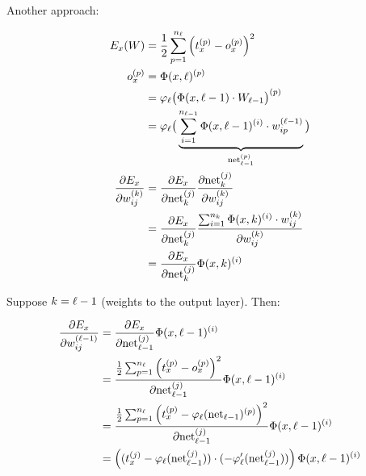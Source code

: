 


Another approach:

\begin{align}
    E_x(W) &= \frac{1}{2} \sum_{p=1}^{n_{\ell}} \left ( t_x^{(p)} -o_x^{(p)} \right )^2\\
    o_x^{(p)} &= \Phi(x, {\ell})^{(p)} \\
              &= \varphi_{{\ell}} \big (\Phi(x, {\ell}-1) \cdot W_{{\ell}-1} \big)^{(p)}\\
              &= \varphi_{{\ell}} \big (
                  \underbrace{
                      \sum_{i=1}^{n_{{\ell}-1}} \Phi(x, {\ell}-1)^{(i)} \cdot w_{ip}^{({\ell}-1)}
                  }_{\mathrm{net}_{{\ell}-1}^{(p)}} \big)\\
    \frac{\partial E_x}{\partial w_{ij}^{(k)}} &= \frac{\partial E_x}{\partial \mathrm{net}_k^{(j)}} \frac{\partial \mathrm{net}_k^{(j)}}{\partial w_{ij}^{(k)}}\\
    &= \frac{\partial E_x}{\partial \mathrm{net}_k^{(j)}} \frac{\sum_{i=1}^{n_{k}} \Phi(x, k)^{(i)} \cdot w_{ij}^{(k)}}{\partial w_{ij}^{(k)}}\\
    &= \frac{\partial E_x}{\partial \mathrm{net}_k^{(j)}} \Phi(x, k)^{(i)}
\end{align}

Suppose $k = {\ell} - 1$ (weights to the output layer). Then:

\begin{align}
    \frac{\partial E_x}{\partial w_{ij}^{(\layernumber-1)}} &= \frac{\partial E_x}{\partial \net_{\layernumber-1}^{(j)}} \Phi(x, \layernumber-1)^{(i)}\\
    &= \frac{\frac{1}{2} \sum_{p=1}^{n_\layernumber} \left ( t_x^{(p)} -o_x^{(p)} \right )^2}{\partial \net_{\layernumber-1}^{(j)}} \Phi(x, \layernumber-1)^{(i)}\\
    &= \frac{\frac{1}{2} \sum_{p=1}^{n_\layernumber} \left ( t_x^{(p)} -\varphi_{\layernumber}(\net_{\layernumber-1})^{(p)} \right )^2}{\partial \net_{\layernumber-1}^{(j)}} \Phi(x, \layernumber-1)^{(i)}\\ %
    &= \left (
            (t_x^{(j)} - \varphi_{\layernumber}(\net_{\layernumber-1}^{(j)})) \cdot (- \varphi_{\layernumber}'(\net_{\layernumber-1}^{(j)}))
       \right ) \Phi(x, \layernumber-1)^{(i)}
\end{align}

